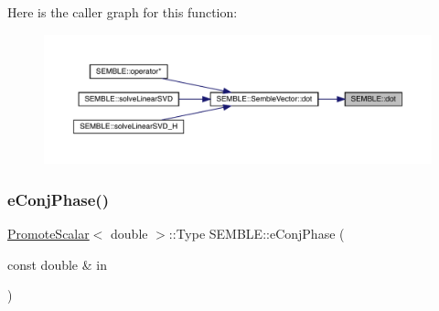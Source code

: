 Here is the caller graph for this function\+:
\nopagebreak
\begin{figure}[H]
\begin{center}
\leavevmode
\includegraphics[width=350pt]{d7/dfd/namespaceSEMBLE_ad2d1d3576d6f13834bc55793e8c940e0_icgraph}
\end{center}
\end{figure}
\mbox{\label{namespaceSEMBLE_a58b3ad4ba97955f042eae4be16a29b21}} 
\subsubsection{\texorpdfstring{eConjPhase()}{eConjPhase()}\hspace{0.1cm}{\footnotesize\ttfamily [1/2]}}
{\footnotesize\ttfamily \mbox{\hyperlink{structSEMBLE_1_1PromoteScalar}{Promote\+Scalar}}$<$ double $>$\+::Type S\+E\+M\+B\+L\+E\+::e\+Conj\+Phase (\begin{DoxyParamCaption}\item[{const double \&}]{in }\end{DoxyParamCaption})}

